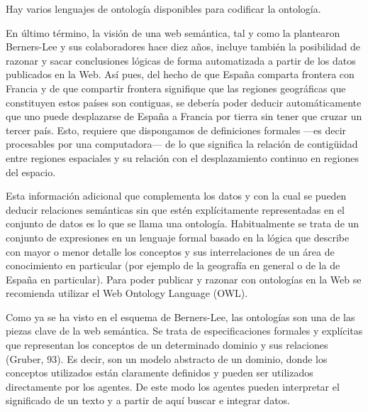 Hay varios lenguajes de ontología disponibles para codificar la ontología.




En último término, la visión de una web semántica, tal y como la plantearon Berners-Lee y sus colaboradores hace diez años, incluye también la posibilidad de razonar y sacar conclusiones lógicas de forma automatizada a partir de los datos publicados en la Web. Así pues, del hecho de que España comparta frontera con Francia y de que compartir frontera signifique que las regiones geográficas que constituyen estos países son contiguas, se debería poder deducir automáticamente que uno puede desplazarse de España a Francia por tierra sin tener que cruzar un tercer país. Esto, requiere que dispongamos de definiciones formales —es decir procesables por una computadora— de lo que significa la relación de contigüidad entre regiones espaciales y su relación con el desplazamiento continuo en regiones del espacio.

Esta información adicional que complementa los datos y con la cual se pueden deducir relaciones semánticas sin que estén explícitamente representadas en el conjunto de datos es lo que se llama una ontología. Habitualmente se trata de un conjunto de expresiones en un lenguaje formal basado en la lógica que describe con mayor o menor detalle los conceptos y sus interrelaciones de un área de conocimiento en particular (por ejemplo de la geografía en general o de la de España en particular). Para poder publicar y razonar con ontologías en la Web se recomienda utilizar el Web Ontology Language (OWL).

Como ya se ha visto en el esquema de Berners-Lee, las ontologías son una de las piezas clave de la web semántica. Se trata de especificaciones formales y explícitas que representan los conceptos de un determinado dominio y sus relaciones (Gruber, 93). Es decir, son un modelo abstracto de un dominio, donde los conceptos utilizados están claramente definidos y pueden ser utilizados directamente por los agentes. De este modo los agentes pueden interpretar el significado de un texto y a partir de aquí buscar e integrar datos.

